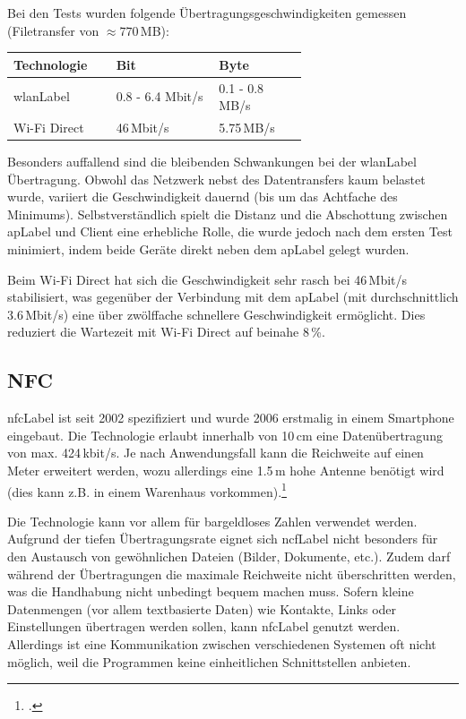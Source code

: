 Bei den Tests wurden folgende Übertragungsgeschwindigkeiten gemessen (Filetransfer von $\approx770$\,MB):
\begin{table}[H]
	\small\sffamily\renewcommand{\arraystretch}{1.4}
	\begin{tabular}{lp{0.35\linewidth}p{0.30\linewidth}}
		\toprule
		Technologie & Bit & Byte\\
		\midrule
		\gls{wlanLabel} & 0.8 - 6.4 Mbit/s & 0.1 - 0.8\,MB/s\\
		Wi-Fi Direct & 46\,Mbit/s & 5.75\,MB/s\\
		\bottomrule
	\end{tabular}
\end{table}

Besonders auffallend sind die bleibenden Schwankungen bei der \gls{wlanLabel} Übertragung.
Obwohl das Netzwerk nebst des Datentransfers kaum belastet wurde, variiert die Geschwindigkeit dauernd (bis um das Achtfache des Minimums).
Selbstverständlich spielt die Distanz und die Abschottung zwischen \gls{apLabel} und Client eine erhebliche Rolle, die wurde jedoch nach dem ersten Test minimiert, indem beide Geräte direkt neben dem \gls{apLabel} gelegt wurden.

Beim Wi-Fi Direct hat sich die Geschwindigkeit sehr rasch bei 46\,Mbit/s stabilisiert, was gegenüber der Verbindung mit dem \gls{apLabel} (mit durchschnittlich 3.6\,Mbit/s) eine über zwölffache schnellere Geschwindigkeit ermöglicht.
Dies reduziert die Wartezeit mit Wi-Fi Direct auf beinahe 8\,\%.

\subsection{NFC}
\gls{nfcLabel} ist seit 2002 spezifiziert und wurde 2006 erstmalig in einem Smartphone eingebaut.
Die Technologie erlaubt innerhalb von 10\,cm eine Datenübertragung von max. 424\,kbit/s.
Je nach Anwendungsfall kann die Reichweite auf einen Meter erweitert werden, wozu allerdings eine 1.5\,m hohe Antenne benötigt wird (dies kann z.B. in einem Warenhaus vorkommen).\footcite{Near_Field_Communication_Wikipedia_2015-05-22}

Die Technologie kann vor allem für bargeldloses Zahlen verwendet werden.
Aufgrund der tiefen Übertragungsrate eignet sich \gls{ncfLabel} nicht besonders für den Austausch von gewöhnlichen Dateien (Bilder, Dokumente, etc.).
Zudem darf während der Übertragungen die maximale Reichweite nicht überschritten werden, was die Handhabung nicht unbedingt bequem machen muss.
Sofern kleine Datenmengen (vor allem textbasierte Daten) wie Kontakte, Links oder Einstellungen übertragen werden sollen, kann \gls{nfcLabel} genutzt werden. Allerdings ist eine Kommunikation zwischen verschiedenen Systemen oft nicht möglich, weil die Programmen keine einheitlichen Schnittstellen anbieten.

